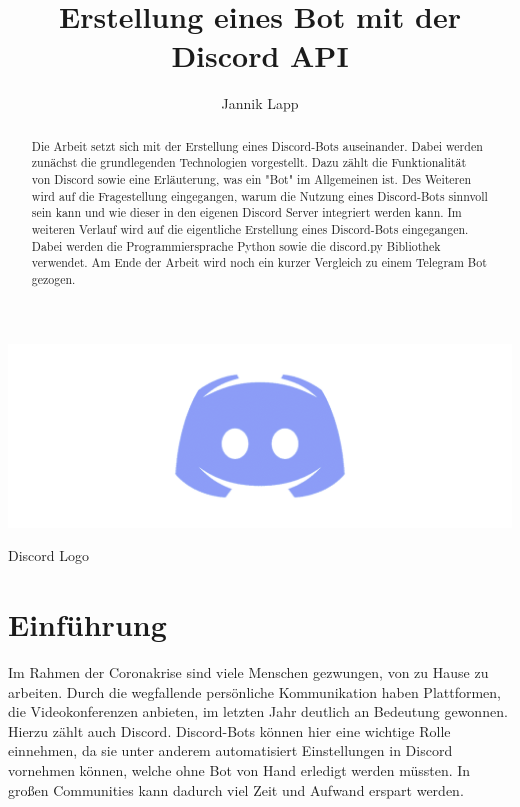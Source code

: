 \documentclass[sigplan,screen]{acmart}
\begin{document}
\title{Erstellung eines Bot mit der Discord API}

\author{Jannik Lapp}


\begin{abstract}
Die Arbeit setzt sich mit der Erstellung eines Discord-Bots auseinander. Dabei werden zunächst die grundlegenden Technologien vorgestellt. Dazu zählt die Funktionalität von Discord \cite{dis1} sowie eine Erläuterung, was ein "Bot" im Allgemeinen ist. Des Weiteren wird auf die Fragestellung eingegangen, warum die Nutzung eines Discord-Bots sinnvoll sein kann und wie dieser in den eigenen Discord Server integriert werden kann. Im weiteren Verlauf wird auf die eigentliche Erstellung eines Discord-Bots eingegangen. Dabei werden die Programmiersprache Python sowie die discord.py Bibliothek \cite{pcdoc1} verwendet. Am Ende der Arbeit wird noch ein kurzer Vergleich zu einem Telegram Bot gezogen.
\end{abstract}



\begin{teaserfigure}
  \includegraphics[width=\textwidth]{sampleteaser}
  \caption{Discord Logo\cite{dis1}}
  \label{fig:teaser}
\end{teaserfigure}


\maketitle
\pagestyle{plain}

\section{Einführung}
Im Rahmen der Coronakrise sind viele Menschen gezwungen, von zu Hause zu arbeiten. Durch die wegfallende persönliche Kommunikation haben Plattformen, die Videokonferenzen anbieten, im letzten Jahr deutlich an Bedeutung gewonnen. Hierzu zählt auch Discord.\cite{beddisco} Discord-Bots können hier eine wichtige Rolle einnehmen, da sie unter anderem automatisiert Einstellungen in Discord vornehmen können, welche ohne Bot von Hand erledigt werden müssten. In großen Communities kann dadurch viel Zeit und Aufwand erspart werden. \cite{whydiscobots}  
\end{document}
